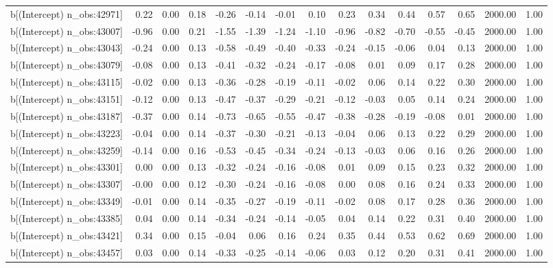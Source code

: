 \begin{table}[ht]
\begin{tabular}{rrrrrrrrrrrrrrr}
  b[(Intercept) n\_obs:42971] & 0.22 & 0.00 & 0.18 & -0.26 & -0.14 & -0.01 & 0.10 & 0.23 & 0.34 & 0.44 & 0.57 & 0.65 & 2000.00 & 1.00 \\ 
  b[(Intercept) n\_obs:43007] & -0.96 & 0.00 & 0.21 & -1.55 & -1.39 & -1.24 & -1.10 & -0.96 & -0.82 & -0.70 & -0.55 & -0.45 & 2000.00 & 1.00 \\ 
  b[(Intercept) n\_obs:43043] & -0.24 & 0.00 & 0.13 & -0.58 & -0.49 & -0.40 & -0.33 & -0.24 & -0.15 & -0.06 & 0.04 & 0.13 & 2000.00 & 1.00 \\ 
  b[(Intercept) n\_obs:43079] & -0.08 & 0.00 & 0.13 & -0.41 & -0.32 & -0.24 & -0.17 & -0.08 & 0.01 & 0.09 & 0.17 & 0.28 & 2000.00 & 1.00 \\ 
  b[(Intercept) n\_obs:43115] & -0.02 & 0.00 & 0.13 & -0.36 & -0.28 & -0.19 & -0.11 & -0.02 & 0.06 & 0.14 & 0.22 & 0.30 & 2000.00 & 1.00 \\ 
  b[(Intercept) n\_obs:43151] & -0.12 & 0.00 & 0.13 & -0.47 & -0.37 & -0.29 & -0.21 & -0.12 & -0.03 & 0.05 & 0.14 & 0.24 & 2000.00 & 1.00 \\ 
  b[(Intercept) n\_obs:43187] & -0.37 & 0.00 & 0.14 & -0.73 & -0.65 & -0.55 & -0.47 & -0.38 & -0.28 & -0.19 & -0.08 & 0.01 & 2000.00 & 1.00 \\ 
  b[(Intercept) n\_obs:43223] & -0.04 & 0.00 & 0.14 & -0.37 & -0.30 & -0.21 & -0.13 & -0.04 & 0.06 & 0.13 & 0.22 & 0.29 & 2000.00 & 1.00 \\ 
  b[(Intercept) n\_obs:43259] & -0.14 & 0.00 & 0.16 & -0.53 & -0.45 & -0.34 & -0.24 & -0.13 & -0.03 & 0.06 & 0.16 & 0.26 & 2000.00 & 1.00 \\ 
  b[(Intercept) n\_obs:43301] & 0.00 & 0.00 & 0.13 & -0.32 & -0.24 & -0.16 & -0.08 & 0.01 & 0.09 & 0.15 & 0.23 & 0.32 & 2000.00 & 1.00 \\ 
  b[(Intercept) n\_obs:43307] & -0.00 & 0.00 & 0.12 & -0.30 & -0.24 & -0.16 & -0.08 & 0.00 & 0.08 & 0.16 & 0.24 & 0.33 & 2000.00 & 1.00 \\ 
  b[(Intercept) n\_obs:43349] & -0.01 & 0.00 & 0.14 & -0.35 & -0.27 & -0.19 & -0.11 & -0.02 & 0.08 & 0.17 & 0.28 & 0.36 & 2000.00 & 1.00 \\ 
  b[(Intercept) n\_obs:43385] & 0.04 & 0.00 & 0.14 & -0.34 & -0.24 & -0.14 & -0.05 & 0.04 & 0.14 & 0.22 & 0.31 & 0.40 & 2000.00 & 1.00 \\ 
  b[(Intercept) n\_obs:43421] & 0.34 & 0.00 & 0.15 & -0.04 & 0.06 & 0.16 & 0.24 & 0.35 & 0.44 & 0.53 & 0.62 & 0.69 & 2000.00 & 1.00 \\ 
  b[(Intercept) n\_obs:43457] & 0.03 & 0.00 & 0.14 & -0.33 & -0.25 & -0.14 & -0.06 & 0.03 & 0.12 & 0.20 & 0.31 & 0.41 & 2000.00 & 1.00 \\ 

\end{tabular}
\end{table}
